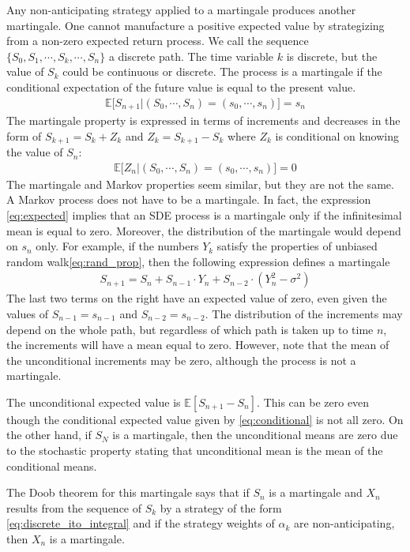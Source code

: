 Any non-anticipating strategy applied to a martingale produces another martingale. One cannot manufacture a positive expected value by strategizing from a non-zero expected return process. We call the sequence $\{S_0, S_1, \cdots, S_k, \cdots, S_n\}$ a discrete path. The time variable $k$ is discrete, but the value of $S_k$ could be continuous or discrete. The process is a martingale if the conditional expectation of the future value is equal to the present value.
\begin{align*}
\mathbb{E}\big[S_{n+1} \big| (S_0,\cdots,S_n)=(s_0, \cdots, s_n)\big] = s_n
\end{align*}
The martingale property is expressed in terms of increments and decreases in the form of $S_{k+1} = S_k + Z_k$ and $Z_k = S_{k+1} - S_k$ where $Z_k$ is conditional on knowing the value of $S_n$:
\begin{align}\label{eq:conditional}
\mathbb{E}\big[Z_n \big|(S_0,\cdots,S_n) = (s_0,\cdots,s_n)\big] = 0
\end{align}
The martingale and Markov properties seem similar, but they are not the same. A Markov process does not have to be a martingale. In fact, the expression \eqref{eq:expected} implies that an SDE process is a martingale only if the infinitesimal mean is equal to zero.  Moreover, the distribution of the martingale would depend on $s_n$ only. For example, if the numbers $Y_k$ satisfy the properties of unbiased random walk\eqref{eq:rand_prop}, then the following expression defines a martingale
\begin{align*}
S_{n+1}=S_n + S_{n-1}\cdot Y_n + S_{n-2}\cdot(Y_n^2 - \sigma^2)
\end{align*}
The last two terms on the right have an expected value of zero, even given the values of $S_{n-1}=s_{n-1}$ and $S_{n-2}=s_{n-2}$. The distribution of the increments may depend on the whole path, but regardless of which path is taken up to time $n$, the increments will have a mean equal to zero. However, note that the mean of the unconditional increments may be zero, although the process is not a martingale. 

The unconditional expected value is $\mathbb{E}[S_{n+1} - S_n]$. This can be zero even though the conditional expected value given by \eqref{eq:conditional} is not all zero. On the other hand, if $S_N$ is a martingale, then the unconditional means are zero due to the stochastic property stating that unconditional mean is the mean of the conditional means.

The Doob theorem for this martingale says that if $S_n$ is a martingale and $X_n$ results from the sequence of $S_k$ by a strategy of the form \eqref{eq:discrete_ito_integral} and if the strategy weights of $\alpha_k$ are non-anticipating, then $X_n$ is a martingale.

